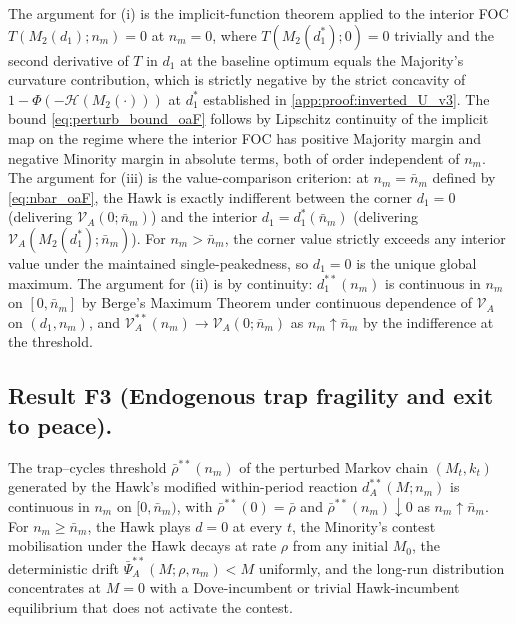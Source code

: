 \documentclass[11pt,twoside]{extarticle}
\begin{document}
The argument for (i) is the implicit-function theorem applied to the interior FOC $T(M_2(d_1);n_m)=0$ at $n_m=0$, where $T(M_2(d_1^{*});0)=0$ trivially and the second derivative of $T$ in $d_1$ at the baseline optimum equals the Majority's curvature contribution, which is strictly negative by the strict concavity of $1-\Phi(-\mathcal H(M_2(\cdot)))$ at $d_1^{*}$ established in \autoref{app:proof:inverted_U_v3}. The bound \autoref{eq:perturb_bound_oaF} follows by Lipschitz continuity of the implicit map on the regime where the interior FOC has positive Majority margin and negative Minority margin in absolute terms, both of order independent of $n_m$. The argument for (iii) is the value-comparison criterion: at $n_m=\bar n_m$ defined by \autoref{eq:nbar_oaF}, the Hawk is exactly indifferent between the corner $d_1=0$ (delivering $\mathcal V_A(0;\bar n_m)$) and the interior $d_1=d_1^{*}(\bar n_m)$ (delivering $\mathcal V_A(M_2(d_1^{*});\bar n_m)$). For $n_m>\bar n_m$, the corner value strictly exceeds any interior value under the maintained single-peakedness, so $d_1=0$ is the unique global maximum. The argument for (ii) is by continuity: $d_1^{**}(n_m)$ is continuous in $n_m$ on $[0,\bar n_m]$ by Berge's Maximum Theorem under continuous dependence of $\mathcal V_A$ on $(d_1,n_m)$, and $\mathcal V_A^{**}(n_m)\to\mathcal V_A(0;\bar n_m)$ as $n_m\uparrow\bar n_m$ by the indifference at the threshold.

\subsection*{Result F3 (Endogenous trap fragility and exit to peace).} The trap--cycles threshold $\bar\rho^{**}(n_m)$ of the perturbed Markov chain $(M_t,k_t)$ generated by the Hawk's modified within-period reaction $d_A^{**}(M;n_m)$ is continuous in $n_m$ on $[0,\bar n_m)$, with $\bar\rho^{**}(0)=\bar\rho$ and $\bar\rho^{**}(n_m)\downarrow 0$ as $n_m\uparrow\bar n_m$. For $n_m\ge\bar n_m$, the Hawk plays $d=0$ at every $t$, the Minority's contest mobilisation under the Hawk decays at rate $\rho$ from any initial $M_0$, the deterministic drift $\bar\Psi_A^{**}(M;\rho,n_m)<M$ uniformly, and the long-run distribution concentrates at $M=0$ with a Dove-incumbent or trivial Hawk-incumbent equilibrium that does not activate the contest.
\end{document}
